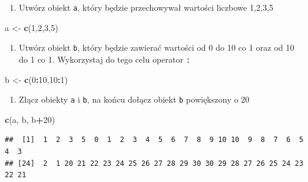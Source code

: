 \documentclass[]{book}
\newenvironment{Shaded}{\begin{snugshade}}{\end{snugshade}}
\newcommand{\KeywordTok}[1]{\textcolor[rgb]{0.13,0.29,0.53}{\textbf{#1}}}
\newcommand{\DecValTok}[1]{\textcolor[rgb]{0.00,0.00,0.81}{#1}}
\newcommand{\StringTok}[1]{\textcolor[rgb]{0.31,0.60,0.02}{#1}}
\newcommand{\OperatorTok}[1]{\textcolor[rgb]{0.81,0.36,0.00}{\textbf{#1}}}
\newcommand{\NormalTok}[1]{#1}
\providecommand{\tightlist}{%
  \setlength{\itemsep}{0pt}\setlength{\parskip}{0pt}}
\theoremstyle{definition}
\theoremstyle{definition}
\theoremstyle{definition}
\theoremstyle{remark}
\begin{document}
\begin{enumerate}
\def\labelenumi{\arabic{enumi}.}
\tightlist
\item
  Utwórz obiekt \texttt{a}, który będzie przechowywał wartości liczbowe
  1,2,3,5
\end{enumerate}

\begin{Shaded}
\begin{Highlighting}[]
\NormalTok{a <-}\StringTok{ }\KeywordTok{c}\NormalTok{(}\DecValTok{1}\NormalTok{,}\DecValTok{2}\NormalTok{,}\DecValTok{3}\NormalTok{,}\DecValTok{5}\NormalTok{)}
\end{Highlighting}
\end{Shaded}

\begin{enumerate}
\def\labelenumi{\arabic{enumi}.}
\setcounter{enumi}{1}
\tightlist
\item
  Utwórz obiekt \texttt{b}, który będzie zawierać wartości od 0 do 10 co
  1 oraz od 10 do 1 co 1. Wykorzystaj do tego celu operator \texttt{:}
\end{enumerate}

\begin{Shaded}
\begin{Highlighting}[]
\NormalTok{b <-}\StringTok{ }\KeywordTok{c}\NormalTok{(}\DecValTok{0}\OperatorTok{:}\DecValTok{10}\NormalTok{,}\DecValTok{10}\OperatorTok{:}\DecValTok{1}\NormalTok{)}
\end{Highlighting}
\end{Shaded}

\begin{enumerate}
\def\labelenumi{\arabic{enumi}.}
\setcounter{enumi}{2}
\tightlist
\item
  Złącz obiekty \texttt{a} i \texttt{b}, na końcu dołącz obiekt
  \texttt{b} powiększony o 20
\end{enumerate}

\begin{Shaded}
\begin{Highlighting}[]
\KeywordTok{c}\NormalTok{(a, b, b}\OperatorTok{+}\DecValTok{20}\NormalTok{)}
\end{Highlighting}
\end{Shaded}

\begin{verbatim}
##  [1]  1  2  3  5  0  1  2  3  4  5  6  7  8  9 10 10  9  8  7  6  5  4  3
## [24]  2  1 20 21 22 23 24 25 26 27 28 29 30 30 29 28 27 26 25 24 23 22 21
\end{verbatim}
\end{document}
